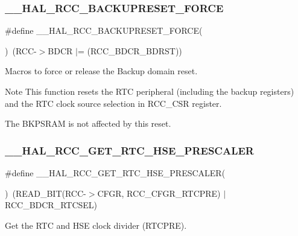 \subsubsection{\texorpdfstring{\_\_HAL\_RCC\_BACKUPRESET\_FORCE}{\_\_HAL\_RCC\_BACKUPRESET\_FORCE}}
{\footnotesize\ttfamily \#define \+\_\+\+\_\+\+H\+A\+L\+\_\+\+R\+C\+C\+\_\+\+B\+A\+C\+K\+U\+P\+R\+E\+S\+E\+T\+\_\+\+F\+O\+R\+CE(\begin{DoxyParamCaption}{ }\end{DoxyParamCaption})~(R\+CC-\/$>$B\+D\+CR $\vert$= (R\+C\+C\+\_\+\+B\+D\+C\+R\+\_\+\+B\+D\+R\+ST))}



Macros to force or release the Backup domain reset. 

\begin{DoxyNote}{Note}
This function resets the R\+TC peripheral (including the backup registers) and the R\+TC clock source selection in R\+C\+C\+\_\+\+C\+SR register. 

The B\+K\+P\+S\+R\+AM is not affected by this reset. 
\end{DoxyNote}
\mbox{\label{group___r_c_c___internal___r_t_c___clock___configuration_ga85dc62f0fcb14981c47d7f7da25e26d6}} 
\subsubsection{\texorpdfstring{\_\_HAL\_RCC\_GET\_RTC\_HSE\_PRESCALER}{\_\_HAL\_RCC\_GET\_RTC\_HSE\_PRESCALER}}
{\footnotesize\ttfamily \#define \+\_\+\+\_\+\+H\+A\+L\+\_\+\+R\+C\+C\+\_\+\+G\+E\+T\+\_\+\+R\+T\+C\+\_\+\+H\+S\+E\+\_\+\+P\+R\+E\+S\+C\+A\+L\+ER(\begin{DoxyParamCaption}{ }\end{DoxyParamCaption})~(R\+E\+A\+D\+\_\+\+B\+IT(R\+CC-\/$>$C\+F\+GR, R\+C\+C\+\_\+\+C\+F\+G\+R\+\_\+\+R\+T\+C\+P\+RE) $\vert$ R\+C\+C\+\_\+\+B\+D\+C\+R\+\_\+\+R\+T\+C\+S\+EL)}



Get the R\+TC and H\+SE clock divider (R\+T\+C\+P\+RE). 


